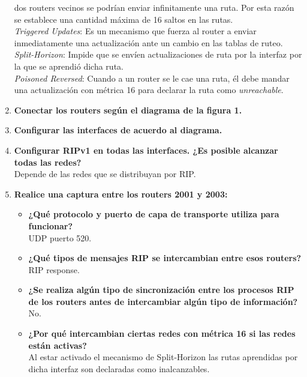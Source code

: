 \documentclass[letterpaper,12pt]{article}
\begin{document}
\begin{enumerate}
		dos routers vecinos se podrían enviar infinitamente una ruta. Por esta razón se establece una cantidad máxima de 16 saltos en las rutas.\\
		\textit{Triggered Updates}: Es un mecanismo que fuerza al router a enviar inmediatamente una actualización ante un cambio en las tablas de ruteo.\\
		\textit{Split-Horizon}: Impide que se envíen actualizaciones de ruta por la interfaz por la que se aprendió dicha ruta.\\
		\textit{Poisoned Reversed}: Cuando a un router se le cae una ruta, él debe mandar una actualización con métrica 16 para declarar la ruta como \textit{unreachable}.

		\item \textbf{Conectar los routers según el diagrama de la figura 1.}
		\item \textbf{Configurar las interfaces de acuerdo al diagrama.}
		\item \textbf{Configurar RIPv1 en todas las interfaces. ¿Es posible alcanzar todas las redes?} \\
		Depende de las redes que se distribuyan por RIP. 
		
		\item \textbf{Realice una captura entre los routers 2001 y 2003:}
		\begin{itemize}
			\item \textbf{¿Qué protocolo y puerto de capa de transporte utiliza para funcionar?} \\
			UDP puerto 520.
			\item \textbf{¿Qué tipos de mensajes RIP se intercambian entre esos routers?} \\
			RIP response.
			\item \textbf{¿Se realiza algún tipo de sincronización entre los procesos RIP de los routers antes de intercambiar algún tipo de información?} \\
			No.
			\item \textbf{¿Por qué intercambian ciertas redes con métrica 16 si las redes están activas?} \\
			Al estar activado el mecanismo de Split-Horizon las rutas aprendidas por dicha interfaz son declaradas como inalcanzables.
		\end{itemize}
		

\end{enumerate}
\end{document}
